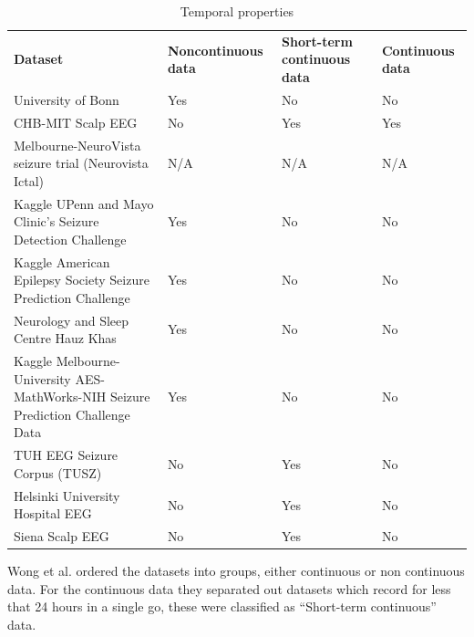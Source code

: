 \documentclass[12pt]{article}
\begin{document}
\begin{table}[H]
\centering
\begin{tabular}{p{}p{}p{}p{}}
  \textbf{Dataset} &
  \textbf{Noncontinuous data} &
  \textbf{Short-term continuous data} &
  \textbf{Continuous data} \\
  
University of Bonn                                                              & Yes & No  & No  \\
CHB-MIT Scalp EEG                                                               & No  & Yes & Yes \\
Melbourne-NeuroVista seizure trial (Neurovista Ictal)                           & N/A & N/A & N/A \\
Kaggle UPenn and Mayo Clinic's Seizure Detection Challenge                      & Yes & No  & No  \\
Kaggle American Epilepsy Society Seizure Prediction Challenge                   & Yes & No  & No  \\
Neurology and Sleep Centre Hauz Khas                                            & Yes & No  & No  \\
Kaggle Melbourne-University AES-MathWorks-NIH Seizure Prediction Challenge Data & Yes & No  & No  \\
TUH EEG Seizure Corpus (TUSZ)                                                   & No  & Yes & No  \\
Helsinki University Hospital EEG                                                & No  & Yes & No  \\
Siena Scalp EEG                                                                 & No  & Yes & No 
\end{tabular}
\caption{Temporal properties \protect\cite{wong2023eeg}}
\end{table}

Wong et al. ordered the datasets into groups, either continuous or non continuous data. For the continuous data they separated out datasets which record for less that 24 hours in a single go, these were classified as ``Short-term continuous'' data.
\end{document}
